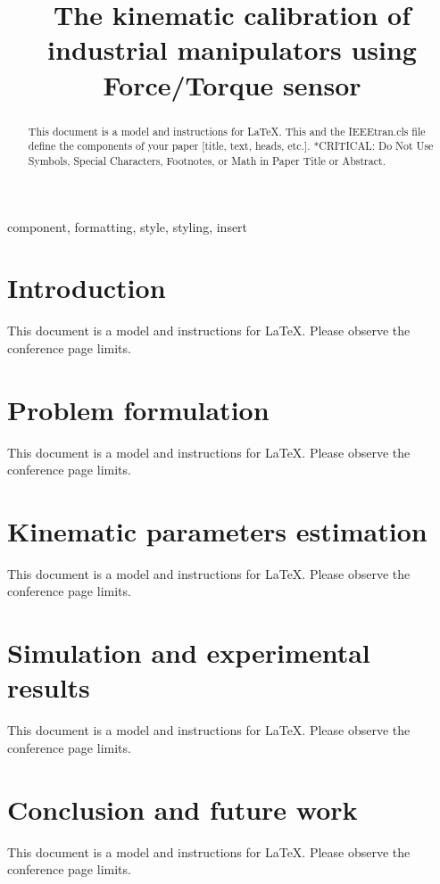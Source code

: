 \documentclass[conference]{IEEEtran}
\begin{document}
\title{
    The kinematic calibration of industrial manipulators using Force/Torque sensor
}

\author{
}

\maketitle

\begin{abstract}
    This document is a model and instructions for \LaTeX.
    This and the IEEEtran.cls file define the components of your paper [title, text, heads, etc.]. *CRITICAL: Do Not Use Symbols, Special Characters, Footnotes,
or Math in Paper Title or Abstract.
\end{abstract}

\begin{IEEEkeywords}
    component, formatting, style, styling, insert
\end{IEEEkeywords}

\section{Introduction}
This document is a model and instructions for \LaTeX.
Please observe the conference page limits.

\section{Problem formulation}
This document is a model and instructions for \LaTeX.
Please observe the conference page limits.

\section{Kinematic parameters estimation}
This document is a model and instructions for \LaTeX.
Please observe the conference page limits.

\section{Simulation and experimental results}
This document is a model and instructions for \LaTeX.
Please observe the conference page limits.

\section{Conclusion and future work}
This document is a model and instructions for \LaTeX.
Please observe the conference page limits.
\end{document}
